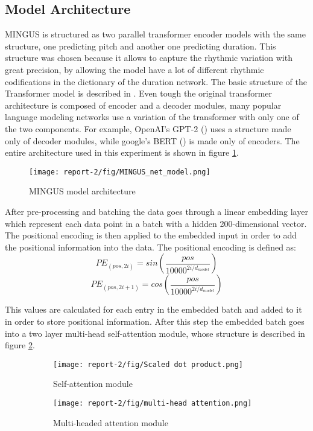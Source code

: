 \documentclass{article}
\begin{document}
\subsection{Model Architecture}
MINGUS is structured as two parallel transformer encoder models with the same structure, one predicting pitch and another one predicting duration. This structure was chosen because it allows to capture the rhythmic variation with great precision, by allowing the model have a lot of different rhythmic codifications in the dictionary of the duration network. 
The basic structure of the Transformer model is described in \cite{AttnAllYouNeed}. Even tough the original transformer architecture is composed of encoder and a decoder modules, many popular language modeling networks use a variation of the transformer with only one of the two components. For example, OpenAI's GPT-2 (\cite{GPT2}) uses a structure made only of decoder modules, while google's BERT (\cite{devlin-etal-2019-bert}) is made only of encoders. 
The entire architecture used in this experiment is shown in figure \ref{fig:model architecture}. 

\begin{figure}[!ht]
    \centering
    \texttt{[image: report-2/fig/MINGUS\_net\_model.png]}
    \caption{MINGUS model architecture 
    \label{fig:model architecture}}
\end{figure}

After pre-processing and batching the data goes through a linear embedding layer which represent each data point in a batch with a hidden 200-dimensional vector. The positional encoding is then applied to the embedded input in order to add the positional information into the data. The positional encoding is defined as:
\[ PE_{(pos,2i)} = sin(\frac{pos}{10000^{2i/d_{model}}})\]
\[ PE_{(pos,2i+1)} = cos(\frac{pos}{10000^{2i/d_{model}}})\]

This values are calculated for each entry in the embedded batch and added to it in order to store positional information. After this step the embedded batch goes into a two layer multi-head self-attention module, whose structure is described in figure \ref{fig:scaled dot}.

\begin{figure}[htbp]
    \centering
     \begin{subfigure}[b]{0.45\textwidth}
         \centering
         \texttt{[image: report-2/fig/Scaled dot product.png]}
         \caption{Self-attention module}
         \label{fig:scaled dot}
     \end{subfigure}
     \hfill
     \begin{subfigure}[b]{0.45\textwidth}
         \centering
         \texttt{[image: report-2/fig/multi-head attention.png]}
         \caption{Multi-headed attention module}
         \label{fig:multi-head}
     \end{subfigure}
	\caption{}
	\label{fig:Attention module}
\end{figure}
\end{document}
